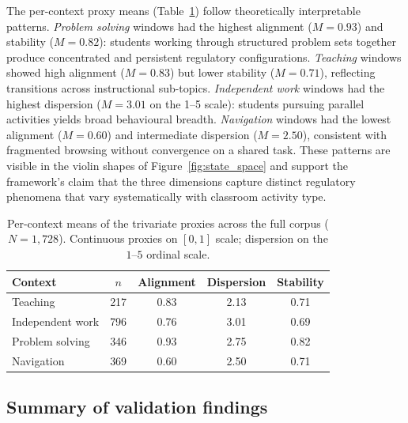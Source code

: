 \documentclass[preprint,12pt,authoryear]{elsarticle}
\begin{document}
The per-context proxy means (Table~\ref{tab:context_means}) follow theoretically interpretable patterns. \textit{Problem solving} windows had the highest alignment ($M = 0.93$) and stability ($M = 0.82$): students working through structured problem sets together produce concentrated and persistent regulatory configurations. \textit{Teaching} windows showed high alignment ($M = 0.83$) but lower stability ($M = 0.71$), reflecting transitions across instructional sub-topics. \textit{Independent work} windows had the highest dispersion ($M = 3.01$ on the 1--5 scale): students pursuing parallel activities yields broad behavioural breadth. \textit{Navigation} windows had the lowest alignment ($M = 0.60$) and intermediate dispersion ($M = 2.50$), consistent with fragmented browsing without convergence on a shared task. These patterns are visible in the violin shapes of Figure~\ref{fig:state_space} and support the framework's claim that the three dimensions capture distinct regulatory phenomena that vary systematically with classroom activity type.

\begin{table}[h]
\centering
\caption{Per-context means of the trivariate proxies across the full corpus ($N = 1{,}728$). Continuous proxies on $[0, 1]$ scale; dispersion on the $1$--$5$ ordinal scale.}
\label{tab:context_means}
\begin{tabular}{lcccc}
\hline
Context & $n$ & Alignment & Dispersion & Stability \\
\hline
Teaching & 217 & 0.83 & 2.13 & 0.71 \\
Independent work & 796 & 0.76 & 3.01 & 0.69 \\
Problem solving & 346 & 0.93 & 2.75 & 0.82 \\
Navigation & 369 & 0.60 & 2.50 & 0.71 \\
\hline
\end{tabular}
\end{table}

\subsection{Summary of validation findings}
\label{sec:results-summary}
\end{document}

